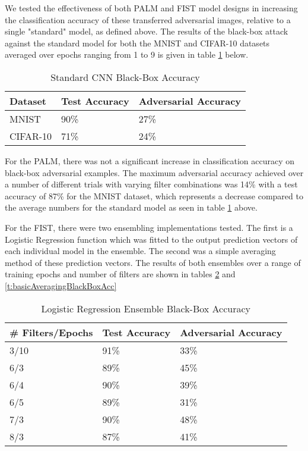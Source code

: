 We tested the effectiveness of both PALM and FIST model designs in increasing the classification accuracy of these transferred adversarial images, relative to a single "standard" model, as defined above.
The results of the black-box attack against the standard model for both the MNIST and CIFAR-10 datasets averaged over epochs ranging from 1 to 9 is given in table \ref{t:standardBlackBoxAcc} below.
\begin{table}
    \begin{center}
        \caption{Standard CNN Black-Box Accuracy}
        \label{t:standardBlackBoxAcc}
        \begin{tabular}{l|l|l}\hline
        \textbf{Dataset} & \textbf{Test Accuracy} & \textbf{Adversarial Accuracy}\\\hline
        MNIST & 90\% & 27\% \\\hline
        CIFAR-10 & 71\% & 24\% \\\hline
        \end{tabular}
    \end{center}
\end{table}

For the PALM, there was not a significant increase in classification accuracy on black-box adversarial examples.
The maximum adversarial accuracy achieved over a number of different trials with varying filter combinations was 14\% with a test accuracy of 87\% for the MNIST dataset, which represents a decrease compared to the average numbers for the standard model as seen in table \ref{t:standardBlackBoxAcc} above.

For the FIST, there were two ensembling implementations tested.
The first is a Logistic Regression function which was fitted to the output prediction vectors of each individual model in the ensemble.
The second was a simple averaging method of these prediction vectors.
The results of both ensembles over a range of training epochs and number of filters are shown in tables \ref{t:logisticRegressionBlackBoxAcc} and \ref{t:basicAveragingBlackBoxAcc}

\begin{table}
    \begin{center}
        \caption{Logistic Regression Ensemble Black-Box Accuracy}
        \label{t:logisticRegressionBlackBoxAcc}
        \begin{tabular}{l|l|l}\hline
        \textbf{\# Filters/Epochs} & \textbf{Test Accuracy} & \textbf{Adversarial Accuracy}\\\hline
        3/10 & 91\% & 33\% \\\hline
        6/3 & 89\% & 45\% \\\hline
        6/4 & 90\% & 39\% \\\hline
        6/5 & 89\% & 31\% \\\hline
        7/3 & 90\% & 48\% \\\hline
        8/3 & 87\% & 41\% \\\hline
        \end{tabular}
    \end{center}
\end{table}

